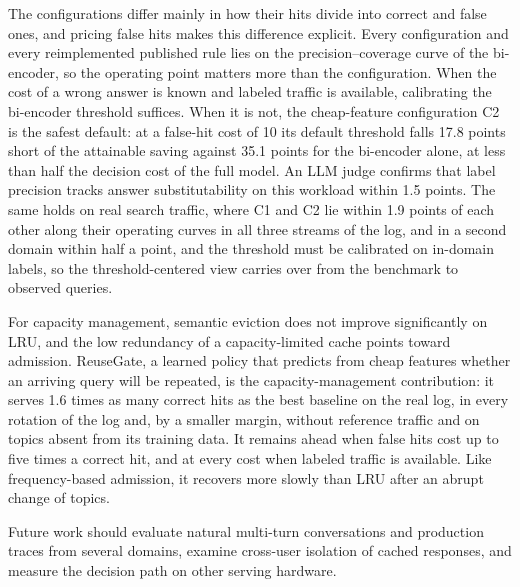 \documentclass[authoryear,preprint,review,12pt]{elsarticle}
\begin{document}
The configurations differ mainly in how their hits divide into correct and false ones, and pricing false hits makes this difference explicit. Every configuration and every reimplemented published rule lies on the precision--coverage curve of the bi-encoder, so the operating point matters more than the configuration. When the cost of a wrong answer is known and labeled traffic is available, calibrating the bi-encoder threshold suffices. When it is not, the cheap-feature configuration C2 is the safest default: at a false-hit cost of 10 its default threshold falls 17.8 points short of the attainable saving against 35.1 points for the bi-encoder alone, at less than half the decision cost of the full model. An LLM judge confirms that label precision tracks answer substitutability on this workload within 1.5 points. The same holds on real search traffic, where C1 and C2 lie within 1.9 points of each other along their operating curves in all three streams of the log, and in a second domain within half a point, and the threshold must be calibrated on in-domain labels, so the threshold-centered view carries over from the benchmark to observed queries.

For capacity management, semantic eviction does not improve significantly on LRU, and the low redundancy of a capacity-limited cache points toward admission. ReuseGate, a learned policy that predicts from cheap features whether an arriving query will be repeated, is the capacity-management contribution: it serves 1.6 times as many correct hits as the best baseline on the real log, in every rotation of the log and, by a smaller margin, without reference traffic and on topics absent from its training data. It remains ahead when false hits cost up to five times a correct hit, and at every cost when labeled traffic is available. Like frequency-based admission, it recovers more slowly than LRU after an abrupt change of topics.

Future work should evaluate natural multi-turn conversations and production traces from several domains, examine cross-user isolation of cached responses, and measure the decision path on other serving hardware.
\appendix
\end{document}
